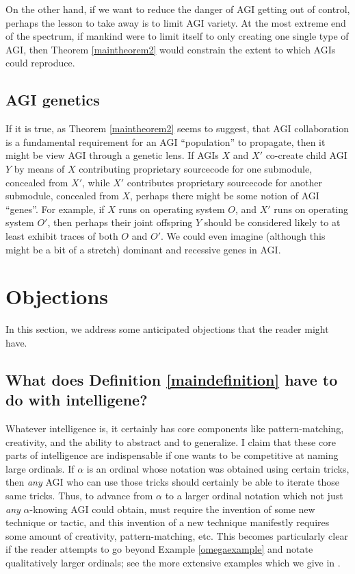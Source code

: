 \documentclass[runningheads]{llncs}
\begin{document}
On the other hand, if we want to reduce the danger of AGI getting out of control,
perhaps the lesson to take away is to limit AGI variety. At the most extreme end
of the spectrum, if mankind were to limit itself to only creating one single
type of AGI, then Theorem \ref{maintheorem2} would constrain the extent to which
AGIs could reproduce.


\subsection{AGI genetics}

If it is true, as Theorem \ref{maintheorem2} seems to suggest, that AGI collaboration
is a fundamental requirement for an AGI ``population'' to propagate, then it might
be view AGI through a genetic lens. If AGIs $X$ and $X'$ co-create child AGI $Y$ by
means of $X$ contributing proprietary sourcecode for one submodule, concealed from $X'$,
while $X'$ contributes proprietary sourcecode for another submodule, concealed from $X$,
perhaps there might be some notion of AGI ``genes''. For example, if $X$ runs on operating
system $O$, and $X'$ runs on operating system $O'$, then perhaps their joint offspring
$Y$ should be considered likely to at least exhibit traces of both $O$ and $O'$.
We could even imagine (although this might be a bit of a stretch) dominant and recessive
genes in AGI.


\section{Objections}
\label{objectionsection}

In this section, we address some anticipated objections that the reader might have.

\subsection{What does Definition \ref{maindefinition} have to do with intelligene?}

Whatever intelligence is, it certainly has core components like pattern-matching,
creativity, and the ability to abstract and to generalize.
I claim that these core parts of intelligence are indispensable if one wants to
be competitive at naming large ordinals. If $\alpha$ is an ordinal whose
notation was obtained using certain tricks, then \emph{any} AGI who can use those
tricks should certainly be able to iterate those same tricks. Thus, to advance from
$\alpha$ to a larger ordinal notation which not just \emph{any} $\alpha$-knowing
AGI could obtain, must require the invention of some new technique or tactic, and
this invention of a new technique manifestly requires some amount of creativity,
pattern-matching, etc. This becomes particularly clear if the reader attempts to
go beyond Example \ref{omegaexample} and notate qualitatively larger ordinals;
see the more extensive examples which we give in \cite{alexander2019measuring}.
\end{document}
